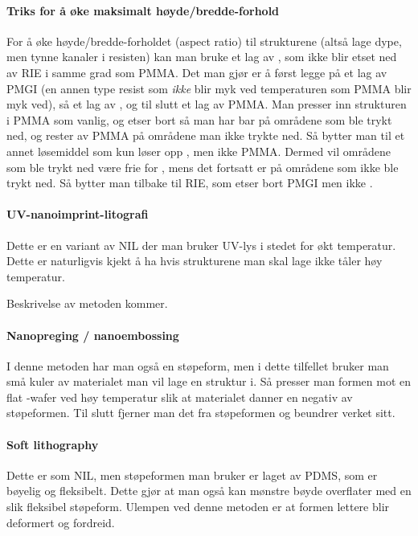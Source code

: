 \paragraph{Triks for å øke maksimalt høyde/bredde-forhold} For å øke høyde/bredde-forholdet (aspect ratio) til strukturene (altså lage dype, men tynne kanaler i resisten) kan man bruke et lag av , som ikke blir etset ned av RIE i samme grad som PMMA. Det man gjør er å først legge på et lag av PMGI (en annen type resist som \emph{ikke} blir myk ved temperaturen som PMMA blir myk ved), så et lag av , og til slutt et lag av PMMA. Man presser inn strukturen i PMMA som vanlig, og etser bort så man har bar  på områdene som ble trykt ned, og rester av PMMA på områdene man ikke trykte ned. Så bytter man til et annet løsemiddel som kun løser opp , men ikke PMMA. Dermed vil områdene som ble trykt ned være frie for , mens det fortsatt er  på områdene som ikke ble trykt ned. Så bytter man tilbake til RIE, som etser bort PMGI men ikke . 

\paragraph{UV-nanoimprint-litografi} Dette er en variant av NIL der man bruker UV-lys i stedet for økt temperatur. Dette er naturligvis kjekt å ha hvis strukturene man skal lage ikke tåler høy temperatur. 

Beskrivelse av metoden kommer. 

\paragraph{Nanopreging / nanoembossing}
I denne metoden har man også en støpeform, men i dette tilfellet bruker man små kuler av materialet man vil lage en struktur i. Så presser man formen mot en flat -wafer ved høy temperatur slik at materialet danner en negativ av støpeformen. Til slutt fjerner man det fra støpeformen og beundrer verket sitt.

\paragraph{Soft lithography}
Dette er som NIL, men støpeformen man bruker er laget av PDMS, som er bøyelig og fleksibelt. Dette gjør at man også kan mønstre bøyde overflater med en slik fleksibel støpeform. Ulempen ved denne metoden er at formen lettere blir deformert og fordreid.

